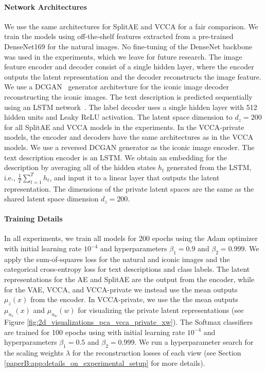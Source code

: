 \paragraph{Network Architectures} We use the same architectures for SplitAE and VCCA for a fair comparison. We train the models using off-the-shelf features extracted from a pre-trained DenseNet169 for the natural images. No fine-tuning of the DenseNet backbone was used in the experiments, which we leave for future research. The image feature encoder and decoder consist of a single hidden layer, where the encoder outputs the latent representation and the decoder reconstructs the image feature. We use a DCGAN~ generator architecture for the iconic image decoder reconstructing the iconic images. The text description is predicted sequentially using an LSTM network~. The label decoder uses a single hidden layer with 512 hidden units and Leaky ReLU activation. 
The latent space dimension to $d_{z} = 200$ for all SplitAE and VCCA models in the experiments. In the VCCA-private models, the encoder and decoders have the same architectures as in the VCCA models. We use a reversed DCGAN generator as the iconic image encoder. The text description encoder is an LSTM. We obtain an embedding for the description by averaging all of the hidden states $h_t$ generated from the LSTM, i.e., $\frac{1}{T} \sum_{t=1}^{T} h_t$, and input it to a linear layer that outputs the latent representation. The dimensions of the private latent spaces are the same as the shared latent space dimension $d_{z} = 200$. 

\vspace{-3mm}
\paragraph{Training Details} In all experiments, we train all models for 200 epochs using the Adam optimizer~ with initial learning rate $10^{-4}$ and hyperparameters $\beta_1 = 0.9$ and $\beta_2 = 0.999$. We apply the sum-of-squares loss for the natural and iconic images and the categorical cross-entropy loss for text descriptions and class labels. The latent representations for the AE and SplitAE are the output from the encoder, while for the VAE, VCCA, and VCCA-private we instead use the mean outputs $\mu_{z}(x)$ from the encoder. In VCCA-private, we use the the mean outputs $\mu_{u_{x}}(x)$ and $\mu_{u_{w}}(w)$ for visualizing the private latent representations (see Figure \ref{fig:2d_visualizations_pca_vcca_private_xw}). The Softmax classifiers are trained for 100 epochs using with initial learning rate $10^{-4}$ and hyperparameters $\beta_1 = 0.5$ and $\beta_2 = 0.999$. We run a hyperparameter search for the scaling weights $\lambda$ for the reconstruction losses of each view (see Section \ref{paperB:app:details_on_experimental_setup} %
for more details). 

